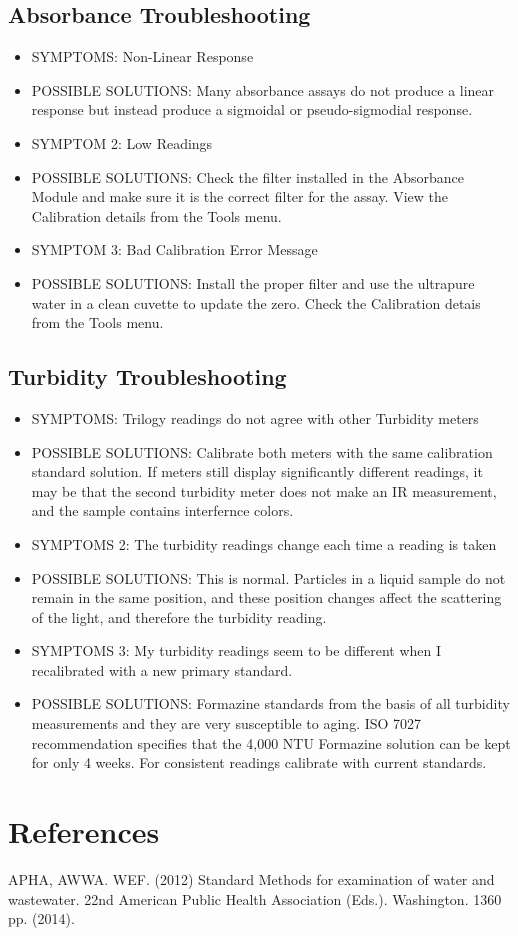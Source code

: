\documentclass[12pt]{../SOP3_beta}
\begin{document}
\subsection{Absorbance Troubleshooting}
\begin{itemize}
  \item SYMPTOMS: Non-Linear Response
  \item POSSIBLE SOLUTIONS: Many absorbance assays do not produce a linear response but instead produce a sigmoidal or pseudo-sigmodial response. 
  \item SYMPTOM 2: Low Readings
  \item POSSIBLE SOLUTIONS: Check the filter installed in the Absorbance Module and make sure it is the correct filter for the assay. View the Calibration details from the Tools menu.
  \item SYMPTOM 3: Bad Calibration Error Message
  \item POSSIBLE SOLUTIONS: Install the proper filter and use the ultrapure water in a clean cuvette to update the zero. Check the Calibration detais from the Tools menu. 
\end{itemize}

\subsection{Turbidity Troubleshooting}
\begin{itemize}
  \item SYMPTOMS: Trilogy readings do not agree with other Turbidity meters
  \item POSSIBLE SOLUTIONS: Calibrate both meters with the same calibration standard solution. If meters still display significantly different readings, it may be that the second turbidity meter does not make an IR measurement, and the sample contains interfernce colors. 
  \item SYMPTOMS 2: The turbidity readings change each time a reading is taken
  \item POSSIBLE SOLUTIONS: This is normal. Particles in a liquid sample do not remain in the same position, and these position changes affect the scattering of the light, and therefore the turbidity reading. 
  \item SYMPTOMS 3: My turbidity readings seem to be different when I recalibrated with a new primary standard.
  \item POSSIBLE SOLUTIONS: Formazine standards from the basis of all turbidity measurements and they are very susceptible to aging. ISO 7027 recommendation specifies that the 4,000 NTU Formazine solution can be kept for only 4 weeks. For consistent readings calibrate with current standards. 
\end{itemize}

\section{References}

\NP APHA, AWWA. WEF. (2012) Standard Methods for examination of water and wastewater. 22nd American Public Health Association (Eds.). Washington. 1360 pp. (2014).
\end{document}
